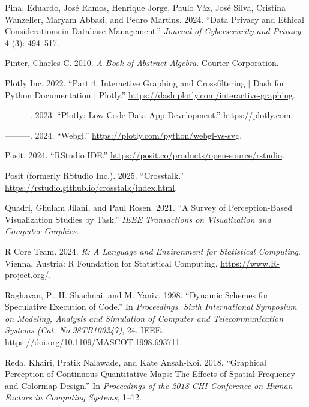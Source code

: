\documentclass[
]{book}
\newlength{\cslhangindent}
\newenvironment{CSLReferences}[2] %
 {\begin{list}{}{%
  \setlength{\itemindent}{0pt}
  \setlength{\leftmargin}{0pt}
  \setlength{\parsep}{0pt}
  \ifodd #1
   \setlength{\leftmargin}{\cslhangindent}
   \setlength{\itemindent}{-1\cslhangindent}
  \fi
  \setlength{\itemsep}{#2\baselineskip}}}
 {\end{list}}
\theoremstyle{definition}
\theoremstyle{definition}
\theoremstyle{definition}
\theoremstyle{definition}
\theoremstyle{remark}
\begin{document}
\begin{CSLReferences}{1}{0}
Pina, Eduardo, José Ramos, Henrique Jorge, Paulo Váz, José Silva, Cristina Wanzeller, Maryam Abbasi, and Pedro Martins. 2024. {``Data Privacy and Ethical Considerations in Database Management.''} \emph{Journal of Cybersecurity and Privacy} 4 (3): 494--517.

Pinter, Charles C. 2010. \emph{A Book of Abstract Algebra}. Courier Corporation.

Plotly Inc. 2022. {``{Part 4. Interactive Graphing and Crossfiltering {\(\vert\)} Dash for Python Documentation {\(\vert\)} Plotly}.''} \url{https://dash.plotly.com/interactive-graphing}.

---------. 2023. {``{Plotly: Low-Code Data App Development}.''} \url{https://plotly.com}.

---------. 2024. {``Webgl.''} \url{https://plotly.com/python/webgl-vs-svg}.

Posit. 2024. {``{RStudio IDE}.''} \url{https://posit.co/products/open-source/rstudio}.

Posit (formerly RStudio Inc.). 2025. {``{Crosstalk}.''} \url{https://rstudio.github.io/crosstalk/index.html}.

Quadri, Ghulam Jilani, and Paul Rosen. 2021. {``A Survey of Perception-Based Visualization Studies by Task.''} \emph{IEEE Transactions on Visualization and Computer Graphics}.

R Core Team. 2024. \emph{R: A Language and Environment for Statistical Computing}. Vienna, Austria: R Foundation for Statistical Computing. \url{https://www.R-project.org/}.

Raghavan, P., H. Shachnai, and M. Yaniv. 1998. {``Dynamic Schemes for Speculative Execution of Code.''} In \emph{Proceedings. Sixth International Symposium on Modeling, Analysis and Simulation of Computer and Telecommunication Systems (Cat. No.98TB100247)}, 24. IEEE. \url{https://doi.org/10.1109/MASCOT.1998.693711}.

Reda, Khairi, Pratik Nalawade, and Kate Ansah-Koi. 2018. {``Graphical Perception of Continuous Quantitative Maps: The Effects of Spatial Frequency and Colormap Design.''} In \emph{Proceedings of the 2018 CHI Conference on Human Factors in Computing Systems}, 1--12.


\end{CSLReferences}
\end{document}
